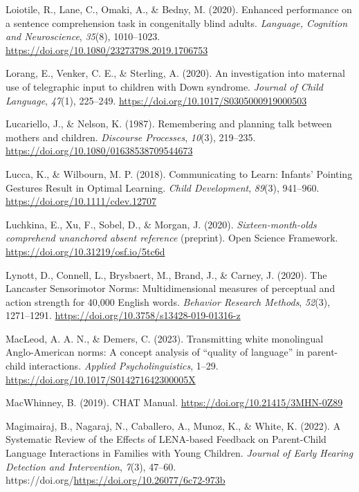 \documentclass[
  man]{apa6}
\newlength{\cslhangindent}
\newlength{\cslentryspacingunit} %
\newenvironment{CSLReferences}[2] %
 {%
  \setlength{\parindent}{0pt}
  \ifodd #1
  \let\oldpar\par
  \def\par{\hangindent=\cslhangindent\oldpar}
  \fi
  \setlength{\parskip}{#2\cslentryspacingunit}
 }%
 {}
\begin{document}
\begin{CSLReferences}{1}{0}
\leavevmode{}%
Loiotile, R., Lane, C., Omaki, A., \& Bedny, M. (2020). Enhanced performance on a sentence comprehension task in congenitally blind adults. \emph{Language, Cognition and Neuroscience}, \emph{35}(8), 1010--1023. \url{https://doi.org/10.1080/23273798.2019.1706753}

\leavevmode{}%
Lorang, E., Venker, C. E., \& Sterling, A. (2020). An investigation into maternal use of telegraphic input to children with {Down} syndrome. \emph{Journal of Child Language}, \emph{47}(1), 225--249. \url{https://doi.org/10.1017/S0305000919000503}

\leavevmode{}%
Lucariello, J., \& Nelson, K. (1987). Remembering and planning talk between mothers and children. \emph{Discourse Processes}, \emph{10}(3), 219--235. \url{https://doi.org/10.1080/01638538709544673}

\leavevmode{}%
Lucca, K., \& Wilbourn, M. P. (2018). Communicating to {Learn}: {Infants}' {Pointing} {Gestures} {Result} in {Optimal} {Learning}. \emph{Child Development}, \emph{89}(3), 941--960. \url{https://doi.org/10.1111/cdev.12707}

\leavevmode{}%
Luchkina, E., Xu, F., Sobel, D., \& Morgan, J. (2020). \emph{Sixteen-month-olds comprehend unanchored absent reference} (preprint). Open Science Framework. \url{https://doi.org/10.31219/osf.io/5tc6d}

\leavevmode{}%
Lynott, D., Connell, L., Brysbaert, M., Brand, J., \& Carney, J. (2020). The {Lancaster} {Sensorimotor} {Norms}: Multidimensional measures of perceptual and action strength for 40,000 {English} words. \emph{Behavior Research Methods}, \emph{52}(3), 1271--1291. \url{https://doi.org/10.3758/s13428-019-01316-z}

\leavevmode{}%
MacLeod, A. A. N., \& Demers, C. (2023). Transmitting white monolingual {Anglo}-{American} norms: {A} concept analysis of {``quality of language''} in parent-child interactions. \emph{Applied Psycholinguistics}, 1--29. \url{https://doi.org/10.1017/S014271642300005X}

\leavevmode{}%
MacWhinney, B. (2019). {CHAT} {Manual}. \url{https://doi.org/10.21415/3MHN-0Z89}

\leavevmode{}%
Magimairaj, B., Nagaraj, N., Caballero, A., Munoz, K., \& White, K. (2022). A {Systematic} {Review} of the {Effects} of {LENA}-based {Feedback} on {Parent}-{Child} {Language} {Interactions} in {Families} with {Young} {Children}. \emph{Journal of Early Hearing Detection and Intervention}, \emph{7}(3), 47--60. https://doi.org/\url{https://doi.org/10.26077/6c72-973b}


\end{CSLReferences}
\end{document}
